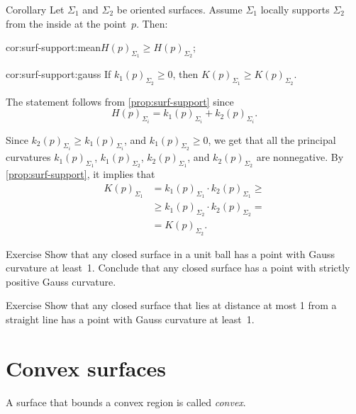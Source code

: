 \begin{thm}{Corollary}\label{cor:surf-support}
Let $\Sigma_1$ and $\Sigma_2$ be oriented surfaces.
Assume $\Sigma_1$ locally supports $\Sigma_2$ from the inside at the point~$p$.
Then:

\begin{subthm}{cor:surf-support:mean}$H(p)_{\Sigma_1}\ge H(p)_{\Sigma_2}$;
\end{subthm}

\begin{subthm}{cor:surf-support:gauss} If $k_1(p)_{\Sigma_2}\ge 0$, then $K(p)_{\Sigma_1}\ge K(p)_{\Sigma_2}$.
\end{subthm}
 
\end{thm}

The statement follows from  \ref{prop:surf-support} since 
\[H(p)_{\Sigma_i}=k_1(p)_{\Sigma_i}+k_2(p)_{\Sigma_i}.\]


 Since $k_2(p)_{\Sigma_i}\ge k_1(p)_{\Sigma_i}$, and $k_1(p)_{\Sigma_2}\ge 0$, we get that all the principal curvatures 
$k_1(p)_{\Sigma_1}$, 
$k_1(p)_{\Sigma_2}$, 
$k_2(p)_{\Sigma_1}$, and 
$k_2(p)_{\Sigma_2}$ are nonnegative.
By \ref{prop:surf-support}, it implies that
\begin{align*}
K(p)_{\Sigma_1}&=k_1(p)_{\Sigma_1}\cdot k_2(p)_{\Sigma_1}\ge 
\\
&\ge k_1(p)_{\Sigma_2}\cdot k_2(p)_{\Sigma_2}=
\\
&=K(p)_{\Sigma_2}.
\end{align*}
\qedsf

\begin{thm}{Exercise}\label{ex:positive-gauss-0}
Show that any closed surface in a unit ball has a point with Gauss curvature at least~1.
Conclude that any closed surface has a point with strictly positive Gauss curvature.
\end{thm}

\begin{thm}{Exercise}\label{ex:positive-gauss}
Show that any closed surface that lies at distance at most 1 from a straight line has a point with Gauss curvature at least~1.
\end{thm}

\section{Convex surfaces}

A surface that bounds a convex region is called \emph{convex}.

